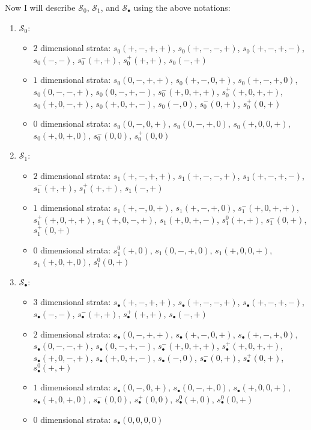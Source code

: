 \begin{definition}
Now I will describe $\mathcal{S}_0$, $\mathcal{S}_1$, and $\mathcal{S}_\bullet$ using the above notations:
\begin{enumerate}
\item $\mathcal{S}_0$:
\begin{itemize}
\item $2$ dimensional strata: $s_0(+,-,+,+)$, $s_0(+,-,-,+)$, $s_0(+,-,+,-)$, $s_0(-,-)$, $s_0^-(+,+)$, $s_0^+(+,+)$, $s_0(-,+)$

\item $1$ dimensional strata: $s_0(0,-,+,+)$, $s_0(+,-,0,+)$, $s_0(+,-,+,0)$, $s_0(0,-,-,+)$, $s_0(0,-,+,-)$, $s_0^-(+,0,+,+)$, $s_0^+(+,0,+,+)$, $s_0(+,0,-,+)$, $s_0(+,0,+,-)$, $s_0(-,0)$, $s_0^-(0,+)$, $s_0^+(0,+)$

\item $0$ dimensional strata: $s_0(0,-,0,+)$, $s_0(0,-,+,0)$, $s_0(+,0,0,+)$, $s_0(+,0,+,0)$, $s_0^-(0,0)$, $s_0^+(0,0)$
\end{itemize}

\item $\mathcal{S}_1$:
\begin{itemize}
\item $2$ dimensional strata: $s_1(+,-,+,+)$, $s_1(+,-,-,+)$, $s_1(+,-,+,-)$, $s_1^-(+,+)$, $s_1^+(+,+)$, $s_1(-,+)$

\item $1$ dimensional strata: $s_1(+,-,0,+)$, $s_1(+,-,+,0)$, $s_1^-(+,0,+,+)$, $s_1^+(+,0,+,+)$, $s_1(+,0,-,+)$, $s_1(+,0,+,-)$, $s_1^0(+,+)$, $s_1^-(0,+)$, $s_1^+(0,+)$

\item $0$ dimensional strata: $s_1^0(+,0)$, $s_1(0,-,+,0)$, $s_1(+,0,0,+)$, $s_1(+,0,+,0)$, $s_1^0(0,+)$
\end{itemize}

\item $\mathcal{S}_\bullet$:
\begin{itemize}
\item $3$ dimensional strata: $s_\bullet(+,-,+,+)$, $s_\bullet(+,-,-,+)$, $s_\bullet(+,-,+,-)$, $s_\bullet(-,-)$, $s_\bullet^-(+,+)$, $s_\bullet^+(+,+)$, $s_\bullet(-,+)$

\item $2$ dimensional strata: $s_\bullet(0,-,+,+)$, $s_\bullet(+,-,0,+)$, $s_\bullet(+,-,+,0)$, $s_\bullet(0,-,-,+)$, $s_\bullet(0,-,+,-)$, $s_\bullet^-(+,0,+,+)$, $s_\bullet^+(+,0,+,+)$, $s_\bullet(+,0,-,+)$, $s_\bullet(+,0,+,-)$, $s_\bullet(-,0)$, $s_\bullet^-(0,+)$, $s_\bullet^+(0,+)$, $s_\bullet^0(+,+)$

\item $1$ dimensional strata: $s_\bullet(0,-,0,+)$, $s_\bullet(0,-,+,0)$, $s_\bullet(+,0,0,+)$, $s_\bullet(+,0,+,0)$, $s_\bullet^-(0,0)$, $s_\bullet^+(0,0)$, $s_\bullet^0(+,0)$, $s_\bullet^0(0,+)$

\item $0$ dimensional strata: $s_\bullet(0,0,0,0)$
\end{itemize}
\end{enumerate}
\end{definition}

